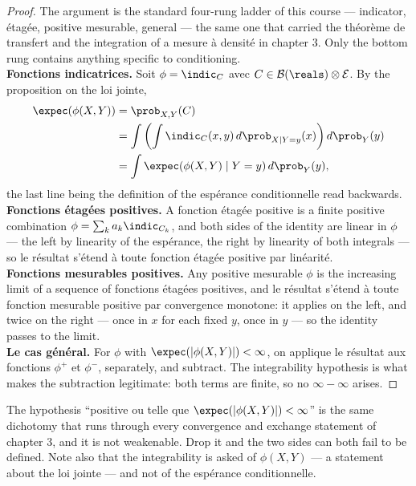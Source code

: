 \begin{proof}
  The argument is the standard four-rung ladder of this course --- indicator,
  étagée, positive mesurable, general --- the same one that carried the théorème
  de transfert and the integration of a mesure à densité in chapter 3. Only the
  bottom rung contains anything specific to conditioning.\\

  \textbf{Fonctions indicatrices.} Soit $\phi = \indic_{C}$ avec
  $C \in \mathcal{B}(\reals) \otimes \mathcal{E}$. By the proposition on the loi
  jointe,
  \begin{align*}
    \expec(\phi(X,Y)) &= \prob_{X,Y}(C) \\
    &= \int \left( \int \indic_{C}(x,y) \, d\prob_{X \mid Y = y}(x) \right) d\prob_{Y}(y) \\
    &= \int \expec(\phi(X,Y) \mid Y = y) \, d\prob_{Y}(y) ,
  \end{align*}
  the last line being the definition of the espérance conditionnelle read
  backwards.\\

  \textbf{Fonctions étagées positives.} A fonction étagée positive is a finite
  positive combination $\phi = \sum_{k} a_{k} \indic_{C_{k}}$, and both sides
  of the identity are linear in $\phi$ --- the left by linearity of the
  espérance, the right by linearity of both integrals --- so le résultat s'étend à
  toute fonction étagée positive par linéarité.\\

  \textbf{Fonctions mesurables positives.} Any positive mesurable $\phi$ is
  the increasing limit of a sequence of fonctions étagées positives, and le
  résultat s'étend à toute fonction mesurable positive par convergence monotone: it
  applies on the left, and twice on the right --- once in $x$ for each fixed $y$,
  once in $y$ --- so the identity passes to the limit.\\

  \textbf{Le cas général.} For $\phi$ with $\expec(|\phi(X,Y)|) < \infty$,
  on applique le résultat aux fonctions $\phi^{+}$ et $\phi^{-}$, separately, and
  subtract. The integrability hypothesis is what makes the subtraction legitimate:
  both terms are finite, so no $\infty - \infty$ arises.
\end{proof}

\begin{remark}
  The hypothesis ``positive ou telle que $\expec(|\phi(X,Y)|) < \infty$'' is the
  same dichotomy that runs through every convergence and exchange statement of
  chapter 3, and it is not weakenable. Drop it and the two sides can both fail to
  be defined. Note also that the integrability is asked of
  $\phi(X,Y)$ --- a statement about the loi jointe --- and not of the espérance
  conditionnelle.
\end{remark}

